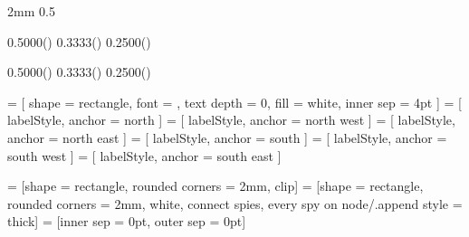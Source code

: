 
\usepackage{calc}
\usepackage{tikz}
\usetikzlibrary{calc,positioning,spy,shapes}


\newlength{\pfull}  \setlength{\pfull}  {2mm}
\newlength{\phalf}  \setlength{\phalf}  {0.5\pfull}

\newlength{\lwffp}   \setlength{\lwffp}   {0.5000\dimexpr(\pfull)}
\newlength{\lwfffp}  \setlength{\lwfffp}  {0.3333\dimexpr(\pfull)}
\newlength{\lwffffp} \setlength{\lwffffp} {0.2500\dimexpr(\pfull)}
\newlength{\lwfffffp}\setlength{\lwfffffp}{0.2000\dimexpr(\linewidth-4.0\pfull)}

\newlength{\twffp}   \setlength{\twffp}   {0.5000\dimexpr(\pfull)}
\newlength{\twfffp}  \setlength{\twfffp}  {0.3333\dimexpr(\pfull)}
\newlength{\twffffp} \setlength{\twffffp} {0.2500\dimexpr(\pfull)}
\newlength{\twfffffp}\setlength{\twfffffp}{0.2000\dimexpr(\textwidth-4.0\pfull)}

 = [ shape = rectangle, font = \scriptsize, text depth = 0, fill = white, inner sep = 4pt ]
  = [ labelStyle, anchor = north ]
 = [ labelStyle, anchor = north west ]
 = [ labelStyle, anchor = north east ]
  = [ labelStyle, anchor = south ]
 = [ labelStyle, anchor = south west ]
 = [ labelStyle, anchor = south east ]

 = [shape = rectangle, rounded corners = 2mm, clip] %
 = [shape = rectangle, rounded corners = 2mm, %
    white, connect spies, every spy on node/.append style = {thick}] %
 = [inner sep = 0pt, outer sep = 0pt] %
